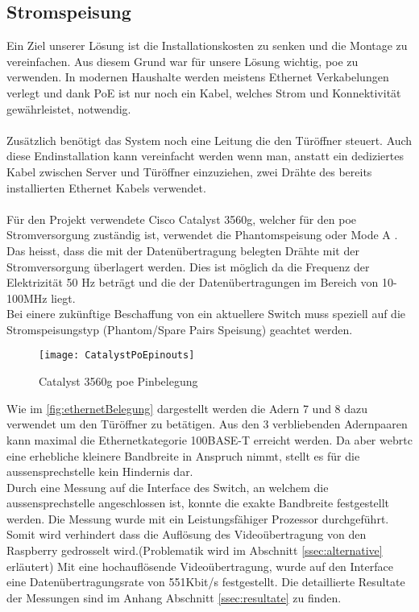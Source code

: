 \subsection{Stromspeisung}
\label{sec:poe}
Ein Ziel unserer Lösung ist die Installationskosten zu senken und die Montage zu vereinfachen. Aus diesem Grund war für unsere Lösung wichtig, \gls{poe} zu verwenden. In modernen Haushalte werden meistens Ethernet Verkabelungen verlegt und dank PoE ist nur noch ein Kabel, welches Strom und Konnektivität gewährleistet, notwendig.
\\
\\
Zusätzlich benötigt das System noch eine Leitung die den Türöffner steuert.
Auch diese Endinstallation kann vereinfacht werden wenn man, anstatt ein dediziertes Kabel zwischen Server und Türöffner einzuziehen,  zwei Drähte des bereits installierten Ethernet Kabels verwendet.
\\
\\
Für den Projekt verwendete Cisco Catalyst 3560g, welcher für den \gls{poe} Stromversorgung zuständig ist, verwendet die Phantomspeisung oder Mode A \cite{poe}. Das heisst, dass die mit der Datenübertragung belegten Drähte mit der Stromversorgung überlagert werden. Dies ist möglich da die Frequenz der Elektrizität 50 Hz beträgt und die der Datenübertragungen im Bereich von 10-100MHz liegt.
\\
Bei einere zukünftige Beschaffung von ein aktuellere Switch muss speziell auf die Stromspeisungstyp (Phantom/Spare Pairs Speisung) geachtet werden.

\begin{figure}[htb!]
	\begin{center}
		\texttt{[image: CatalystPoEpinouts]}
		\caption[Catalyst Pinouts]{Catalyst 3560g \gls{poe} Pinbelegung}
		\label{fig:catalystPinouts}
	\end{center}
\end{figure}

Wie im \cref{fig:ethernetBelegung} dargestellt werden die Adern 7 und 8 dazu verwendet um den Türöffner zu betätigen. Aus den 3 verbliebenden Adernpaaren kann maximal die Ethernetkategorie 100BASE-T erreicht werden. Da aber \gls{webrtc} eine erhebliche kleinere Bandbreite in Anspruch nimmt, stellt es für die \gls{aussensprechstelle} kein Hindernis dar.
\\
Durch eine Messung auf die Interface des Switch, an welchem die \gls{aussensprechstelle} angeschlossen ist, konnte die exakte Bandbreite festgestellt werden. Die Messung wurde mit ein Leistungsfähiger Prozessor durchgeführt. Somit wird verhindert dass die Auflösung des Videoübertragung von den Raspberry gedrosselt wird.(Problematik wird im Abschnitt \ref{ssec:alternative} erläutert)
Mit eine hochauflösende Videoübertragung, wurde auf den Interface eine Datenübertragungsrate von 551Kbit/s festgestellt. Die detaillierte Resultate der Messungen sind im Anhang Abschnitt \ref{ssec:resultate} zu finden.

